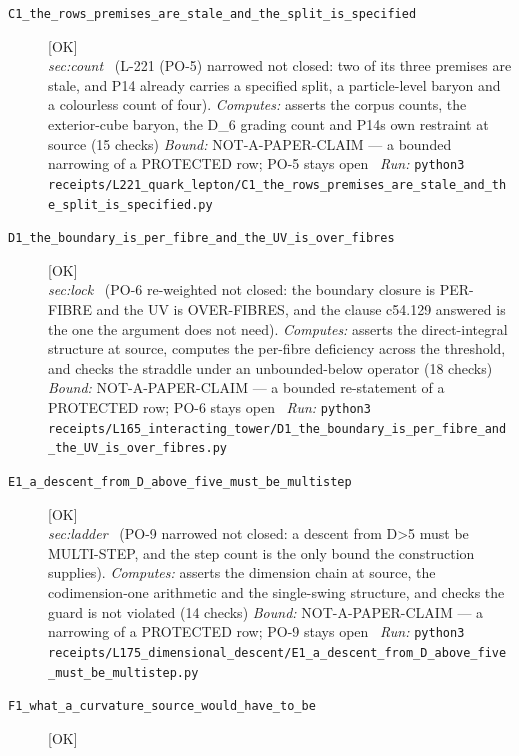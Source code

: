 \begin{description}
\item[\label{rcpt:C1_the_rows_premises_are_stale_and_the_split_is_specified}\texttt{C1\_the\_rows\_premises\_are\_stale\_and\_the\_split\_is\_specified}]\hfill\textsf{[OK]}\\
\textit{sec:count} \ (L-221 (PO-5) narrowed not closed: two of its three premises are stale, and P14 already carries a specified split, a particle-level baryon and a colourless count of four). 
\emph{Computes:} asserts the corpus counts, the exterior-cube baryon, the D\_6 grading count and P14s own restraint at source (15 checks)
 \emph{Bound:} NOT-A-PAPER-CLAIM --- a bounded narrowing of a PROTECTED row; PO-5 stays open
\ \emph{Run:} \texttt{python3 receipts/L221\_quark\_lepton/C1\_the\_rows\_premises\_are\_stale\_and\_the\_split\_is\_specified.py}
\item[\label{rcpt:D1_the_boundary_is_per_fibre_and_the_UV_is_over_fibres}\texttt{D1\_the\_boundary\_is\_per\_fibre\_and\_the\_UV\_is\_over\_fibres}]\hfill\textsf{[OK]}\\
\textit{sec:lock} \ (PO-6 re-weighted not closed: the boundary closure is PER-FIBRE and the UV is OVER-FIBRES, and the clause c54.129 answered is the one the argument does not need). 
\emph{Computes:} asserts the direct-integral structure at source, computes the per-fibre deficiency across the threshold, and checks the straddle under an unbounded-below operator (18 checks)
 \emph{Bound:} NOT-A-PAPER-CLAIM --- a bounded re-statement of a PROTECTED row; PO-6 stays open
\ \emph{Run:} \texttt{python3 receipts/L165\_interacting\_tower/D1\_the\_boundary\_is\_per\_fibre\_and\_the\_UV\_is\_over\_fibres.py}
\item[\label{rcpt:E1_a_descent_from_D_above_five_must_be_multistep}\texttt{E1\_a\_descent\_from\_D\_above\_five\_must\_be\_multistep}]\hfill\textsf{[OK]}\\
\textit{sec:ladder} \ (PO-9 narrowed not closed: a descent from D>5 must be MULTI-STEP, and the step count is the only bound the construction supplies). 
\emph{Computes:} asserts the dimension chain at source, the codimension-one arithmetic and the single-swing structure, and checks the guard is not violated (14 checks)
 \emph{Bound:} NOT-A-PAPER-CLAIM --- a narrowing of a PROTECTED row; PO-9 stays open
\ \emph{Run:} \texttt{python3 receipts/L175\_dimensional\_descent/E1\_a\_descent\_from\_D\_above\_five\_must\_be\_multistep.py}
\item[\label{rcpt:F1_what_a_curvature_source_would_have_to_be}\texttt{F1\_what\_a\_curvature\_source\_would\_have\_to\_be}]\hfill\textsf{[OK]}\\

\end{description}
